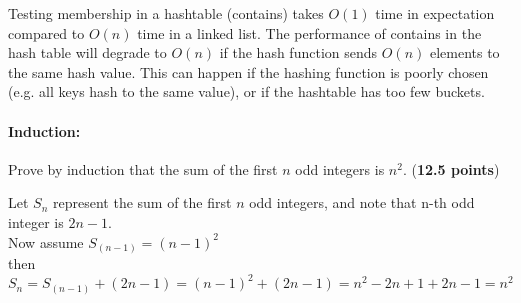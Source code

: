 \documentclass[12pt,twoside]{article}
\begin{document}
{\color{red}
Testing membership in a hashtable (contains) takes $O(1)$ time in expectation compared to $O(n)$ time in a linked list. The performance of contains in the hash table will degrade to $O(n)$ if the hash function sends $O(n)$ elements to the same hash value. This can happen if the hashing function is poorly chosen (e.g. all keys hash to the same value), or if the hashtable has too few buckets.
}

\paragraph{Induction:} Prove by induction that the sum of the first $n$ odd integers is $n^2$. (\textbf{12.5 points})

{
	\color{red}

Let $S_n$ represent the sum of the first $n$ odd integers, and note that n-th odd integer is $2n-1$.\\

	Now assume $S_{(n-1)} = (n - 1)^2$\\
	then $S_n =S_{(n-1)}+(2n-1)=(n-1)^2+(2n-1)=n^2-2n+1+2n-1=n^2$

}
\end{document}
